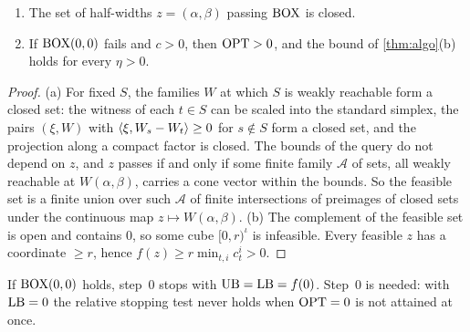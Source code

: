 \begin{proposition}[closedness]\label{prop:closed}
\leavevmode
\begin{enumerate}[label=(\alph*)]
\item The set of half-widths $z=(\alpha,\beta)$ passing $\mathrm{BOX}$ is closed.
\item If $\mathrm{BOX}(0,0)$ fails and $c>0$, then $\mathrm{OPT}>0$, and the bound of \cref{thm:algo}(b) holds for every $\eta>0$.
\end{enumerate}
\end{proposition}
\begin{proof}
(a) For fixed $S$, the families $W$ at which $S$ is weakly reachable form a closed set: the witness of each $t\in S$ can be scaled into the standard simplex, the pairs $(\xi,W)$ with $\langle \xi, W_s-W_t\rangle\ge0$ for $s\notin S$ form a closed set, and the projection along a compact factor is closed. The bounds of the query do not depend on $z$, and $z$ passes if and only if some finite family $\mathcal A$ of sets, all weakly reachable at $W(\alpha,\beta)$, carries a cone vector within the bounds. So the feasible set is a finite union over such $\mathcal A$ of finite intersections of preimages of closed sets under the continuous map $z\mapsto W(\alpha,\beta)$. (b) The complement of the feasible set is open and contains $0$, so some cube $[0,r)^\iota$ is infeasible. Every feasible $z$ has a coordinate $\ge r$, hence $f(z)\ge r\min_{t,i}c^i_t>0$.
\end{proof}
If $\mathrm{BOX}(0,0)$ holds, step~0 stops with $\mathrm{UB}=\mathrm{LB}=f(0)$. Step~0 is needed: with $\mathrm{LB}=0$ the relative stopping test never holds when $\mathrm{OPT}=0$ is not attained at once.

